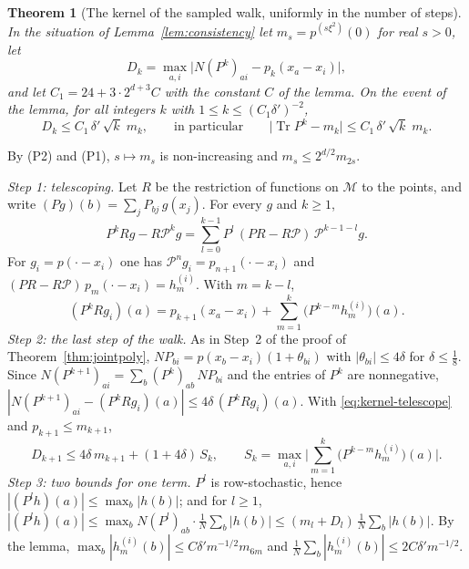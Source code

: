 \documentclass[11pt,a4paper]{article}
\makeatletter
\theoremstyle{stmt}
\newtheorem{theorem}{Theorem}[section]
\theoremstyle{defn}
\theoremstyle{rmk}
\renewenvironment{proof}[1][\proofname]{\par\pushQED{\qed}\normalfont\topsep6\p@\@plus6\p@\relax
  \trivlist\item[\hskip\labelsep{\sffamily\itshape\small #1.}]\ignorespaces}{\popQED\endtrivlist\@endpefalse}
\numberwithin{equation}{section}
\DeclareMathOperator{\Tr}{Tr}
\newcommand{\M}{\mathcal{M}}
\makeatother
\begin{document}
{\begin{theorem}[The kernel of the sampled walk, uniformly in the number of steps]\label{thm:kernel}
In the situation of Lemma~\ref{lem:consistency} let $m_s=p^{(s\xi^2)}(0)$ for real $s>0$, let
\[
D_k=\max_{a,i}\big|N(P^k)_{ai}-p_k(x_a-x_i)\big|,
\]
and let $C_1=24+3\cdot2^{d+3}C$ with the constant $C$ of the lemma. On the event of the lemma, for all integers $k$ with $1\le k\le(C_1\delta')^{-2}$,
\[
D_k\le C_1\,\delta'\,\sqrt k\;m_k,\qquad\text{in particular}\qquad\big|\Tr P^k-m_k\big|\le C_1\,\delta'\,\sqrt k\;m_k .
\]
\end{theorem}

\begin{proof}
By (P2) and (P1), $s\mapsto m_s$ is non-increasing and $m_s\le2^{d/2}m_{2s}$.

\emph{Step 1: telescoping.} Let $R$ be the restriction of functions on $\M$ to the points, and write $(Pg)(b)=\sum_jP_{bj}\,g(x_j)$. For every $g$ and $k\ge1$,
\[
P^kRg-R\mathcal P^kg=\sum_{l=0}^{k-1}P^l\,(PR-R\mathcal P)\,\mathcal P^{k-1-l}g .
\]
For $g_i=p(\cdot-x_i)$ one has $\mathcal P^ng_i=p_{n+1}(\cdot-x_i)$ and $(PR-R\mathcal P)\,p_m(\cdot-x_i)=h^{(i)}_m$. With $m=k-l$,
\begin{equation}\label{eq:kernel-telescope}
(P^kRg_i)(a)=p_{k+1}(x_a-x_i)+\sum_{m=1}^k\big(P^{k-m}h^{(i)}_m\big)(a).
\end{equation}
\emph{Step 2: the last step of the walk.} As in Step~2 of the proof of Theorem~\ref{thm:jointpoly}, $NP_{bi}=p(x_b-x_i)(1+\theta_{bi})$ with $|\theta_{bi}|\le4\delta$ for $\delta\le\frac18$. Since $N(P^{k+1})_{ai}=\sum_b(P^k)_{ab}\,NP_{bi}$ and the entries of $P^k$ are nonnegative, $|N(P^{k+1})_{ai}-(P^kRg_i)(a)|\le4\delta\,(P^kRg_i)(a)$. With \eqref{eq:kernel-telescope} and $p_{k+1}\le m_{k+1}$,
\begin{equation}\label{eq:kernel-rec}
D_{k+1}\le4\delta\,m_{k+1}+(1+4\delta)\,S_k,\qquad S_k=\max_{a,i}\Big|\sum_{m=1}^k\big(P^{k-m}h^{(i)}_m\big)(a)\Big| .
\end{equation}
\emph{Step 3: two bounds for one term.} $P^l$ is row-stochastic, hence $|(P^lh)(a)|\le\max_b|h(b)|$; and for $l\ge1$, $|(P^lh)(a)|\le\max_bN(P^l)_{ab}\cdot\frac1N\sum_b|h(b)|\le(m_l+D_l)\,\frac1N\sum_b|h(b)|$. By the lemma, $\max_b|h^{(i)}_m(b)|\le C\delta'm^{-1/2}m_{6m}$ and $\frac1N\sum_b|h^{(i)}_m(b)|\le2C\delta'm^{-1/2}$.


\end{proof}}
\end{document}
